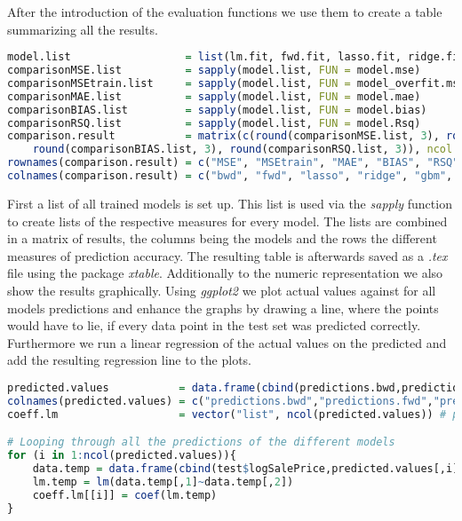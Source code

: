 After the introduction of the evaluation functions we use them to create a table summarizing all the results.
\begin{lstlisting}[language=R]
model.list                  = list(lm.fit, fwd.fit, lasso.fit, ridge.fit, gbmtuned, rftuned)
comparisonMSE.list          = sapply(model.list, FUN = model.mse)
comparisonMSEtrain.list     = sapply(model.list, FUN = model_overfit.mse)
comparisonMAE.list          = sapply(model.list, FUN = model.mae)
comparisonBIAS.list         = sapply(model.list, FUN = model.bias)
comparisonRSQ.list          = sapply(model.list, FUN = model.Rsq)
comparison.result           = matrix(c(round(comparisonMSE.list, 3), round(comparisonMSEtrain.list, 3), round(comparisonMAE.list, 3), 
    round(comparisonBIAS.list, 3), round(comparisonRSQ.list, 3)), ncol = length(model.list), byrow = TRUE)
rownames(comparison.result) = c("MSE", "MSEtrain", "MAE", "BIAS", "RSQ")
colnames(comparison.result) = c("bwd", "fwd", "lasso", "ridge", "gbm", "rf")
\end{lstlisting}
First a list of all trained models is set up. This list is used via the \textit{sapply} function to create lists of the respective measures for every model. The lists are combined in a matrix of results, the columns being the models and the rows the different measures of prediction accuracy. The resulting table is afterwards saved as a \textit{.tex} file using the package \textit{xtable}. Additionally to the numeric representation we also show the results graphically. Using \textit{ggplot2} we plot actual values against   for all models predictions and enhance the graphs by drawing a line, where the points would have to lie, if every data point in the test set was predicted correctly. Furthermore we run a linear regression of the actual values on the predicted and add the resulting regression line to the plots. 
\begin{lstlisting}[language=R]
predicted.values           = data.frame(cbind(predictions.bwd,predictions.fwd,predictions.lasso,predictions.ridge,predictions.gbm,predictions.rf))
colnames(predicted.values) = c("predictions.bwd","predictions.fwd","predictions.lasso","predictions.ridge","predictions.rf","predictions.gbm")
coeff.lm                   = vector("list", ncol(predicted.values)) # preparing an empty list for coefficients of regression

# Looping through all the predictions of the different models
for (i in 1:ncol(predicted.values)){
    data.temp = data.frame(cbind(test$logSalePrice,predicted.values[,i]))
    lm.temp = lm(data.temp[,1]~data.temp[,2])
    coeff.lm[[i]] = coef(lm.temp)
}
\end{lstlisting}
